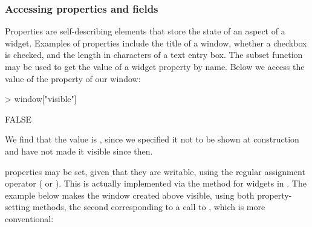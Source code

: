 \documentclass[article,shortnames]{jss}
\begin{document}
\subsubsection{Accessing properties and fields}

Properties are self-describing 
elements that store the state of an aspect of a widget.  Examples of
properties include the title of a window, whether a checkbox is
checked, and the length in characters of a text entry box. The
 subset function \code{[} may be used to get the value of
a widget property by name.  Below we access the value of the
 property of our window:
\begin{CodeChunk}
\begin{CodeInput}
> window["visible"]
\end{CodeInput}
\begin{CodeOutput}
[1] FALSE
\end{CodeOutput}
\end{CodeChunk}
We find that the value is
, since we specified it not to be shown at construction
and have not made it visible since then.

 properties may be set, given that they are writable, using
the regular  assignment operator (\code{<-} or \code{=}).
This is
actually implemented via the \code{[<-} method for  widgets
in . The example below makes the window created above
visible, using both property-setting methods,
the second corresponding to a call to , which is
more conventional:
\end{document}
